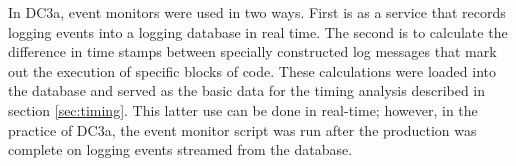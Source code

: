 In DC3a, event monitors were used in two ways.  First is as a service
that records logging events into a logging database in real time.  The
second is to calculate the difference in time stamps between specially
constructed log messages that mark out the execution of specific
blocks of code.  These calculations were loaded into the database and
served as the basic data for the timing analysis described in
section \ref{sec:timing}.  This latter use can be done in real-time;
however, in the practice of DC3a, the event monitor script was run
after the production was complete on logging events streamed from the
database.  

